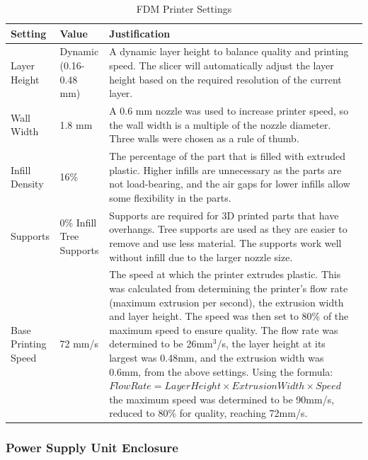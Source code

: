 \begin{table}[H]
    \centering
    {\fontsize{10pt}{12pt}\selectfont
    \begin{tabularx}{\textwidth}{|p{3cm}|p{3cm}|X|}
        \hline
        \textbf{Setting} & \textbf{Value} & \textbf{Justification} \\
        \hline
        Layer Height & Dynamic (0.16-0.48 mm) & A dynamic layer height to balance quality and printing speed. The slicer will automatically adjust the layer height based on the required resolution of the current layer. \\
        \hline
        Wall Width & 1.8 mm & A 0.6 mm nozzle was used to increase printer speed, so the wall width is a multiple of the nozzle diameter. Three walls were chosen as a rule of thumb. \\
        \hline
        Infill Density & 16\% & The percentage of the part that is filled with extruded plastic. Higher infills are unnecessary as the parts are not load-bearing, and the air gaps for lower infills allow some flexibility in the parts. \\
        \hline
        Supports & 0\% Infill Tree Supports & Supports are required for 3D printed parts that have overhangs. Tree supports are used as they are easier to remove and use less material. The supports work well without infill due to the larger nozzle size. \\
        \hline
        Base Printing Speed & 72 mm/s & The speed at which the printer extrudes plastic. This was calculated from determining the printer's flow rate (maximum extrusion per second), the extrusion width and layer height. The speed was then set to 80\% of the maximum speed to ensure quality. The flow rate was determined to be 26mm$^3$/s, the layer height at its largest was 0.48mm, and the extrusion width was 0.6mm, from the above settings. Using the formula: \linebreak $Flow Rate = Layer Height \times Extrusion Width \times Speed$ \linebreak the maximum speed was determined to be 90mm/s, reduced to 80\% for quality, reaching 72mm/s. \\
        \hline
    \end{tabularx}
    }
    \caption{FDM Printer Settings}
    \label{tab:3dprintersettings}
\end{table}

\subsubsection{Power Supply Unit Enclosure}
\label{sec:power-supply-unit-enclosure}

